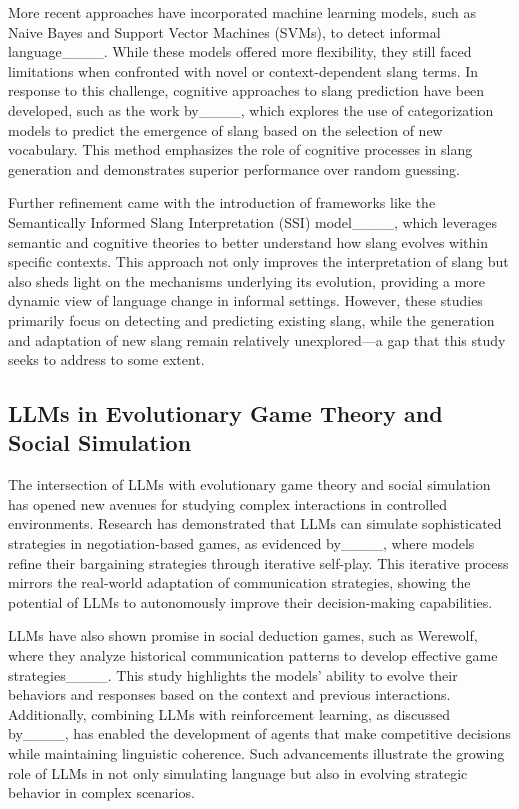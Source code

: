 More recent approaches have incorporated machine learning models, such as Naive Bayes and Support Vector Machines (SVMs), to detect informal language____. While these models offered more flexibility, they still faced limitations when confronted with novel or context-dependent slang terms. In response to this challenge, cognitive approaches to slang prediction have been developed, such as the work by____, which explores the use of categorization models to predict the emergence of slang based on the selection of new vocabulary. This method emphasizes the role of cognitive processes in slang generation and demonstrates superior performance over random guessing.

Further refinement came with the introduction of frameworks like the Semantically Informed Slang Interpretation (SSI) model____, which leverages semantic and cognitive theories to better understand how slang evolves within specific contexts. This approach not only improves the interpretation of slang but also sheds light on the mechanisms underlying its evolution, providing a more dynamic view of language change in informal settings. However, these studies primarily focus on detecting and predicting existing slang, while the generation and adaptation of new slang remain relatively unexplored—a gap that this study seeks to address to some extent.

\subsection{LLMs in Evolutionary Game Theory and Social Simulation}
The intersection of LLMs with evolutionary game theory and social simulation has opened new avenues for studying complex interactions in controlled environments. Research has demonstrated that LLMs can simulate sophisticated strategies in negotiation-based games, as evidenced by____, where models refine their bargaining strategies through iterative self-play. This iterative process mirrors the real-world adaptation of communication strategies, showing the potential of LLMs to autonomously improve their decision-making capabilities.

LLMs have also shown promise in social deduction games, such as Werewolf, where they analyze historical communication patterns to develop effective game strategies____. This study highlights the models’ ability to evolve their behaviors and responses based on the context and previous interactions. Additionally, combining LLMs with reinforcement learning, as discussed by____, has enabled the development of agents that make competitive decisions while maintaining linguistic coherence. Such advancements illustrate the growing role of LLMs in not only simulating language but also in evolving strategic behavior in complex scenarios.

